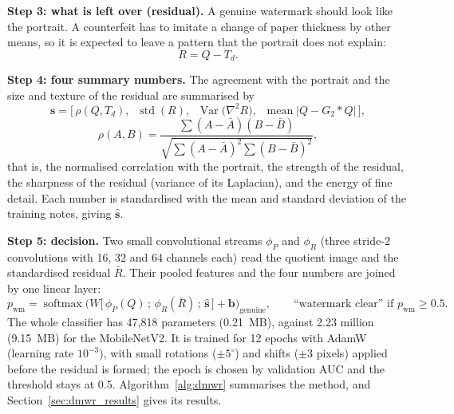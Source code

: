 \textbf{Step 3: what is left over (residual).} A genuine watermark should look like the portrait. A counterfeit has to imitate a change of paper thickness by other means, so it is expected to leave a pattern that the portrait does not explain:
\begin{equation}
R = Q - T_d .
\label{eq:residual}
\end{equation}

\textbf{Step 4: four summary numbers.} The agreement with the portrait and the size and texture of the residual are summarised by
\begin{equation}
\mathbf{s} = \Big[\, \rho(Q, T_d), \;\; \operatorname{std}(R), \;\; \operatorname{Var}\!\big(\nabla^2 R\big), \;\; \operatorname{mean}\big|Q - G_{2} * Q\big| \,\Big],
\label{eq:scalars}
\end{equation}
\begin{equation}
\rho(A,B) = \frac{\sum (A-\bar A)(B-\bar B)}{\sqrt{\sum (A-\bar A)^2 \sum (B-\bar B)^2}},
\label{eq:ncc}
\end{equation}
that is, the normalised correlation with the portrait, the strength of the residual, the sharpness of the residual (variance of its Laplacian), and the energy of fine detail. Each number is standardised with the mean and standard deviation of the training notes, giving $\hat{\mathbf{s}}$.

\textbf{Step 5: decision.} Two small convolutional streams $\phi_P$ and $\phi_R$ (three stride-2 convolutions with 16, 32 and 64 channels each) read the quotient image and the standardised residual $\bar R$. Their pooled features and the four numbers are joined by one linear layer:
\begin{equation}
p_{\text{wm}} = \operatorname{softmax}\!\Big( W \big[\, \phi_P(Q) \,;\, \phi_R(\bar R) \,;\, \hat{\mathbf{s}} \,\big] + \mathbf{b} \Big)_{\text{genuine}},
\qquad \text{``watermark clear'' if } p_{\text{wm}} \ge 0.5 .
\label{eq:dmwr}
\end{equation}
The whole classifier has 47,818 parameters (0.21~MB), against 2.23 million (9.15~MB) for the MobileNetV2. It is trained for 12 epochs with AdamW (learning rate $10^{-3}$), with small rotations ($\pm5^\circ$) and shifts ($\pm3$ pixels) applied before the residual is formed; the epoch is chosen by validation AUC and the threshold stays at 0.5. Algorithm~\ref{alg:dmwr} summarises the method, and Section~\ref{sec:dmwr_results} gives its results.

